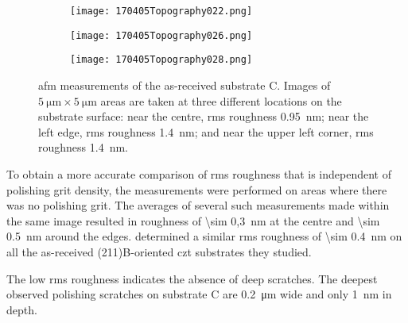 \begin{figure}[htbp]
    \centering
    \begin{subfigure}[t]{0.3\linewidth}
    \centering
        \texttt{[image: 170405Topography022.png]}
        \caption{}%
        \label{fig:subCa_afm_centre}
    \end{subfigure}
    \hfill
    \begin{subfigure}[t]{0.3\linewidth}
    \centering
        \texttt{[image: 170405Topography026.png]}
        \caption{}%
        \label{fig:subCa_afm_edge}
    \end{subfigure}
    \hfill
    \begin{subfigure}[t]{0.3\linewidth}
    \centering
        \texttt{[image: 170405Topography028.png]}
        \caption{}%
        \label{fig:subCa_afm_corner}
    \end{subfigure}
    \caption[\Ac{afm} of as-received substrate C.]{\Acf{afm} measurements of the as-received substrate C. Images of $\SI{5}{\micro\metre}\times\SI{5}{\micro\metre}$ areas are taken at three different locations on the substrate surface:  near the centre, \ac{rms} roughness \SI{0.95}{\nano\metre};  near the left edge, \ac{rms} roughness \SI{1.4}{\nano\metre}; and  near the upper left corner, \ac{rms} roughness \SI{1.4}{\nano\metre}.}
    \label{fig:subCa_afm}
\end{figure} %

To obtain a more accurate comparison of \ac{rms} roughness that is independent of polishing grit density, the measurements were performed on areas where there was no polishing grit. The averages of several such measurements made within the same image resulted in  roughness of \SI{\sim 0,3}{\nano\metre} at the centre and \SI{\sim 0.5}{\nano\metre} around the edges. \citet{benson2015as-received} determined a similar \ac{rms} roughness of \SI{\sim 0.4}{\nano\metre} on all the as-received (211)B-oriented \ac{czt} substrates they studied.

The low \ac{rms} roughness indicates the absence of deep scratches. The deepest observed polishing scratches on substrate C are \SI{0,2}{\micro\metre} wide and only \SI{1}{\nano\metre} in depth. 


